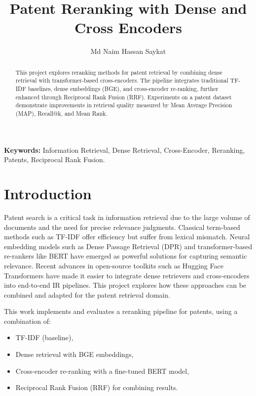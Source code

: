 \documentclass[11pt,a4paper]{article}
\title{\textbf{Patent Reranking with Dense and Cross Encoders}}
\author{Md Naim Hassan Saykat}
\date{}
\begin{document}
\maketitle

\begin{abstract}
This project explores reranking methods for patent retrieval by combining dense retrieval with transformer-based cross-encoders. The pipeline integrates traditional TF-IDF baselines, dense embeddings (BGE), and cross-encoder re-ranking, further enhanced through Reciprocal Rank Fusion (RRF). Experiments on a patent dataset demonstrate improvements in retrieval quality measured by Mean Average Precision (MAP), Recall@k, and Mean Rank.
\end{abstract}

\noindent \textbf{Keywords:} Information Retrieval, Dense Retrieval, Cross-Encoder, Reranking, Patents, Reciprocal Rank Fusion.

\section{Introduction}
Patent search is a critical task in information retrieval due to the large volume of documents and the need for precise relevance judgments. 
Classical term-based methods such as TF-IDF offer efficiency but suffer from lexical mismatch. 
Neural embedding models such as Dense Passage Retrieval (DPR) \cite{karpukhin-etal-2020-dense} and transformer-based re-rankers like BERT \cite{nogueira2019passage} have emerged as powerful solutions for capturing semantic relevance. 
Recent advances in open-source toolkits such as Hugging Face Transformers \cite{wolf2020transformers} have made it easier to integrate dense retrievers and cross-encoders into end-to-end IR pipelines. 
This project explores how these approaches can be combined and adapted for the patent retrieval domain.

This work implements and evaluates a reranking pipeline for patents, using a combination of:
\begin{itemize}
    \item TF-IDF (baseline),
    \item Dense retrieval with BGE embeddings,
    \item Cross-encoder re-ranking with a fine-tuned BERT model,
    \item Reciprocal Rank Fusion (RRF) for combining results.
\end{itemize}

\end{document}
